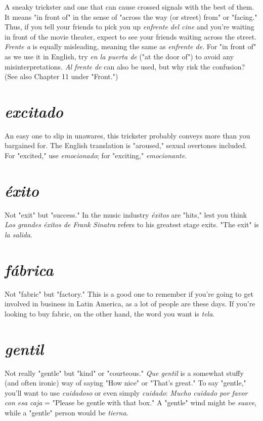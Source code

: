 \documentclass[14pt,a4paper,oneside]{memoir}
\begin{document}
A sneaky trickster and one that can cause
crossed signals with the best of them. It means "in front of" in the
sense of "across the way (or street) from" or "facing." Thus, if you tell
your friends to pick you up \emph{enfrente del cine} and you're waiting in
front of the movie theater, expect to see your friends waiting across
the street. \emph{Frente a} is equally misleading, meaning the same as \emph{enfrente de}. For "in front of" as we use it in English, try \emph{en la puerta de}
("at the door of") to avoid any misinterpretations. \emph{Al frente de} can also
be used, but why risk the confusion? (See also Chapter 11 under
"Front.")

\section{\emph{excitado}}

An easy one to slip in unawares, this trickster
probably conveys more than you bargained for. The English translation
is "aroused," sexual overtones included. For "excited," use \emph{emocionado}; for "exciting," \emph{emocionante}.

\section{\emph{éxito}}

Not "exit" but "success." In the music industry \emph{éxitos}
are "hits," lest you think \emph{Los grandes éxitos de Frank Sinatra} refers to
his greatest stage exits. "The exit" is \emph{la salida}.

\section{\emph{fábrica}}

Not "fabric" but "factory." This is a good one to remember if you're going to get involved in business in Latin America, as
a lot of people are these days. If you're looking to buy fabric, on the
other hand, the word you want is \emph{tela}.

\section{\emph{gentil}}

Not really "gentle" but "kind" or "courteous." \emph{Que
	gentil} is a somewhat stuffy (and often ironic) way of saying "How
nice" or "That's great." To say "gentle," you'll want to use \emph{cuidadoso}
or even simply \emph{cuidado}: \emph{Mucho cuidado por favor con esa caja} =
"Please be gentle with that box." A "gentle" wind might be \emph{suave},
while a "gentle" person would be \emph{tierna}.
\end{document}

